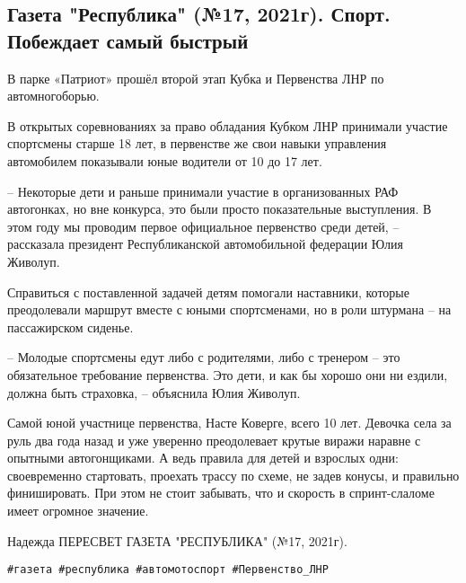  
 
 
 
 
\subsection{Газета "Республика" (№17, 2021г).  Спорт.  Побеждает самый быстрый}

В парке «Патриот» прошёл второй этап Кубка и Первенства ЛНР по автомногоборью.

В открытых соревнованиях за право обладания Кубком ЛНР принимали участие
спортсмены старше 18 лет, в первенстве же свои навыки управления автомобилем
показывали юные водители от 10 до 17 лет.

– Некоторые дети и раньше принимали участие в организованных РАФ автогонках, но
вне конкурса, это были просто показательные выступления. В этом году мы
проводим первое официальное первенство среди детей, – рассказала президент
Республиканской автомобильной федерации Юлия Живолуп.

Справиться с поставленной задачей детям помогали наставники, которые
преодолевали маршрут вместе с юными спортсменами, но в роли штурмана – на
пассажирском сиденье.

– Молодые спортсмены едут либо с родителями, либо с тренером – это обязательное
требование первенства. Это дети, и как бы хорошо они ни ездили, должна быть
страховка, – объяснила Юлия Живолуп.

Самой юной участнице первенства, Насте Коверге, всего 10 лет. Девочка села за
руль два года назад и уже уверенно преодолевает крутые виражи наравне с
опытными автогонщиками. А ведь правила для детей и взрослых одни: своевременно
стартовать, проехать трассу по схеме, не задев конусы, и правильно
финишировать. При этом не стоит забывать, что и скорость в спринт-слаломе имеет
огромное значение.

Надежда ПЕРЕСВЕТ ГАЗЕТА "РЕСПУБЛИКА" (№17, 2021г).

\verb|#газета #республика #автомотоспорт #Первенство_ЛНР|
